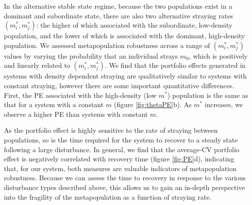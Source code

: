 \documentclass[twocolumn,preprintnumbers,amsmath,amssymb,superscriptaddress]{revtex4}
\begin{document}
In the alternative stable state regime, because the two populations exist in a dominant and subordinate state, there are also two alternative straying rates $(m_i^*,m_j^*)$: the higher of which associated with the subordinate, low-density population, and the lower of which is associated with the dominant, high-density population.
We assessed metapopulation robustness across a range of $(m_i^*,m_j^*)$ values by varying the probability that an individual strays $m_0$, which is positively and linearly related to $(m_i^*,m_j^*)$.
We find that the portfolio effects generated in systems with density dependent straying are qualitatively similar to systems with constant straying, however there are some important quantitative differences.
First, the PE associated with the high-density (low $m^*$) population is the same as that for a system with a constant $m$ (figure \ref{fig:thetaPE}b).
As $m^*$ increases, we observe a higher PE than systems with constant $m$.



As the portfolio effect is highly sensitive to the rate of straying between populations, so is the time required for the system to recover to a steady state following a large disturbance.
In general, we find that the average-CV portfolio effect is negatively correlated with recovery time (figure \ref{fig:PE}d), indicating that, for our system, both measures are valuable indicators of metapopulation robustness.
Because we can assess the time to recovery in response to the various disturbance types described above, this allows us to gain an in-depth perspective into the fragility of the metapopulation as a function of straying rate.
\end{document}
